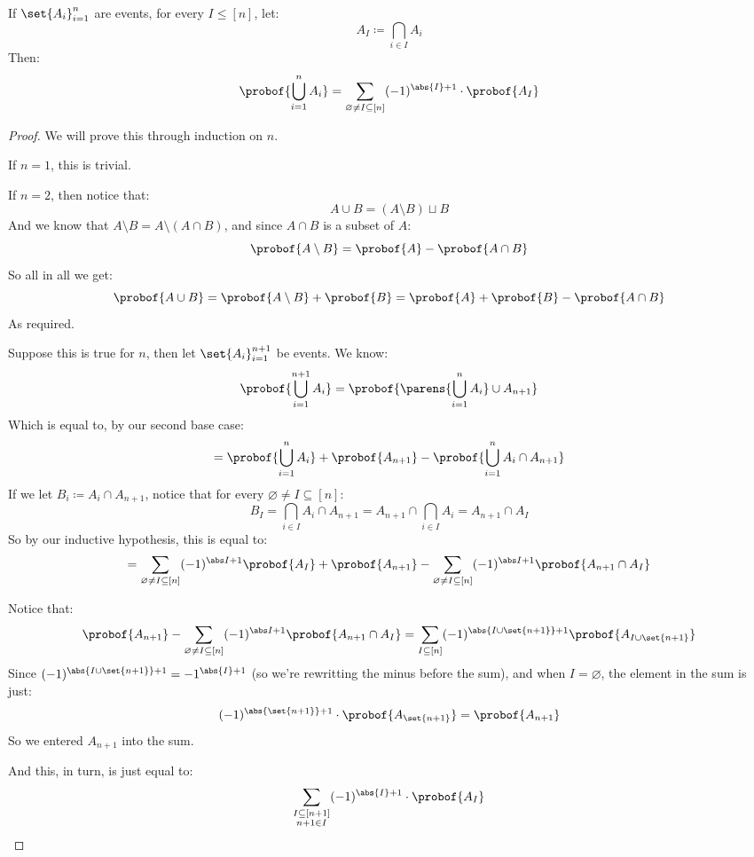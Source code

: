 \begin{thrm*}

	If $\set{A_i}_{i=1}^n$ are events, for every $I\leq[n]$, let:
	\[ A_I\coloneqq\bigcap_{i\in I}A_i \]
	Then:
	\[ \probof{\bigcup_{i=1}^n A_i} = \sum_{\varnothing\neq I\subseteq[n]}(-1)^{\abs{I}+1}\cdot\probof{A_I} \] 

\end{thrm*}

\begin{proof}

	We will prove this through induction on $n$.

	 If $n=1$, this is trivial.

	 If $n=2$, then notice that:
	\[ A\cup B = (A\setminus B)\sqcup B \]
	And we know that $A\setminus B=A\setminus(A\cap B)$, and since $A\cap B$ is a subset of $A$:
	\[ \probof{A\setminus B} = \probof{A} - \probof{A\cap B} \]
	So all in all we get:
	\[ \probof{A\cup B} = \probof{A\setminus B} + \probof{B} = \probof{A} + \probof{B} - \probof{A\cap B} \]
	As required.

	 Suppose this is true for $n$, then let $\set{A_i}_{i=1}^{n+1}$ be events.
	We know:
	\[ \probof{\bigcup_{i=1}^{n+1}A_i} = \probof{\parens{\bigcup_{i=1}^n A_i}\cup A_{n+1}} \]
	Which is equal to, by our second base case:
	\[ = \probof{\bigcup_{i=1}^n A_i} + \probof{A_{n+1}} - \probof{\bigcup_{i=1}^n A_i\cap A_{n+1}} \]
	If we let $B_i\coloneqq A_i\cap A_{n+1}$, notice that for every $\varnothing\neq I\subseteq[n]$:
	\[ B_I = \bigcap_{i\in I} A_i\cap A_{n+1} = A_{n+1}\cap\bigcap_{i\in I}A_i = A_{n+1}\cap A_I \]
	So by our inductive hypothesis, this is equal to:
	\[ = \sum_{\varnothing\neq I\subseteq[n]}(-1)^{\abs I+1}\probof{A_I} + \probof{A_{n+1}} -
		 \sum_{\varnothing\neq I\subseteq[n]}(-1)^{\abs I+1}\probof{A_{n+1}\cap A_I} \]

	Notice that:
	\[ \probof{A_{n+1}} - \sum_{\varnothing\neq I\subseteq[n]}(-1)^{\abs I+1}\probof{A_{n+1}\cap A_I} =
	   \sum_{I\subseteq[n]} (-1)^{\abs{I\cup\set{n+1}}+1}\probof{A_{I\cup\set{n+1}}} \]
	Since $(-1)^{\abs{I\cup\set{n+1}}+1}=-1^{\abs{I}+1}$ (so we're rewritting the minus before the sum),
	and when $I=\varnothing$, the element in the sum is just:
	\[ (-1)^{\abs{\set{n+1}}+1}\cdot\probof{A_{\set{n+1}}} = \probof{A_{n+1}} \]
	So we entered $A_{n+1}$ into the sum.

	And this, in turn, is just equal to:
	\[ \sum_{\substack{I\subseteq[n+1]\\n+1\in I}}(-1)^{\abs{I}+1}\cdot\probof{A_I} \]


\end{proof}

